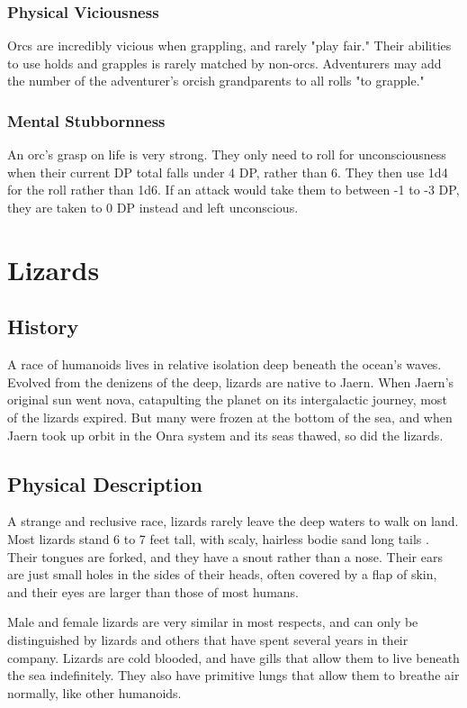 \begin{multicols*}{2}
\subsubsection{Physical Viciousness}
Orcs are incredibly vicious when grappling, and rarely "play fair." Their abilities to use holds and grapples is rarely matched by non-orcs. Adventurers may add the number of the adventurer's orcish grandparents to all rolls "to grapple."
\subsubsection{Mental Stubbornness}
An orc's grasp on life is very strong. They only need to roll for unconsciousness when their current DP total falls under 4 DP, rather than 6. They then use 1d4 for the roll rather than 1d6. If an attack would take them to between -1 to -3 DP, they are taken to 0 DP instead and left unconscious.
\makeline
\section{Lizards}
\subsection{History}
A race of humanoids lives in relative isolation deep beneath the ocean's waves. Evolved from the denizens of the deep, lizards are native to Jaern. When Jaern's original sun went nova, catapulting the planet on its intergalactic journey, most of the lizards expired. But many were frozen at the bottom of the sea, and when Jaern took up orbit in the Onra system and its seas thawed, so did the lizards.
\subsection{Physical Description}
A strange and reclusive race, lizards rarely leave the deep waters to walk on land. Most lizards stand 6 to 7 feet tall, with scaly, hairless bodie sand long tails . Their
tongues are forked, and they have a snout rather than a nose. Their ears are just small holes in the sides of their heads, often covered by a flap of skin, and their eyes are larger than
those of most humans. 

Male and female lizards are very similar in most respects, and can only be distinguished by lizards and others that have spent several years in their company. Lizards are cold blooded, and have gills that allow them to live beneath the sea indefinitely. They also have primitive lungs that allow them to breathe air normally, like other humanoids.


\end{multicols*}
